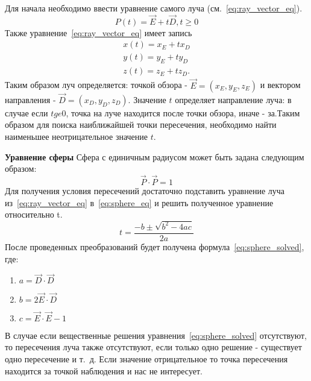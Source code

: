 Для начала необходимо ввести уравнение самого луча (см.~\ref{eq:ray_vector_eq}).
\begin{equation} 
	P(t) = \vec{E} +t\vec{D},t \ge 0
	\label{eq:ray_vector_eq}
\end{equation}
Также уравнение~\ref{eq:ray_vector_eq} имеет запись
\begin{equation}
	\label{eq:ray_scalar_eq}
	\begin{aligned}
		x(t) = x_E + t x_D \\
		y(t) = y_E + t y_D \\
		z(t) = z_E + t z_D.
	\end{aligned}
\end{equation}
Таким образом луч определяется: точкой обзора - $\vec{E} = (x_E,y_E,z_E)$ и вектором направления - $\vec{D} = (x_D,y_D,z_D)$. Значение $t$  определяет направление луча: в случае если $t ge 0$,
точка на луче находится после точки обзора, иначе - за.Таким образом для поиска наиближайшей точки пересечения, необходимо найти наименьшее неотрицательное значение $t$.\cite{Rodgers,primitives_raytracing_equations} 


\textbf{Уравнение сферы}
Сфера с единичным радиусом может быть задана следующим образом:
\begin{equation}
	\vec{P} \cdot \vec{P}=1
	\label{eq:sphere_eq}
\end{equation}
Для получения условия пересечений достаточно подставить уравнение луча из~\ref{eq:ray_vector_eq} в~\ref{eq:sphere_eq} и решить полученное уравнение относительно t.
\begin{equation}
	t=\frac{-b\pm\sqrt{b^2-4ac}}{2a}
	\label{eq:sphere_solved}
\end{equation}
После проведенных преобразований будет получена формула~\ref{eq:sphere_solved}, где:
\begin{enumerate}
	\item $a = \vec{D} \cdot \vec{D}$ 
	\item $b = 2\vec{E} \cdot \vec{D}$ 
	\item $c = \vec{E} \cdot \vec{E} - 1$
\end{enumerate}
В случае если вещественные решения уравнения~\ref{eq:sphere_solved} отсутствуют, то пересечения луча также отсутствуют, если только одно решение  - существует одно
пересечение и т.~д. Если значение отрицательное то точка пересечения находится за точкой наблюдения и нас не интересует.\cite{primitives_raytracing_equations}

